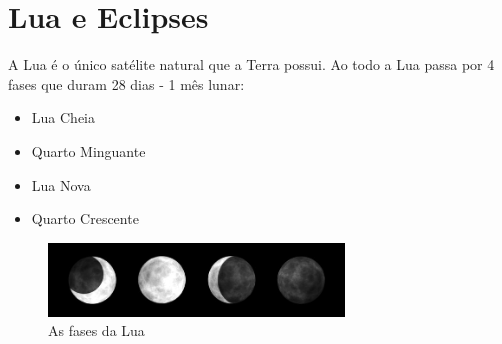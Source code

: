 \documentclass[12pt]{extarticle}
\newcommand{\<}{\langle}
\renewcommand{\>}{\rangle}
\theoremstyle{definition}
\begin{document}
\section{Lua e Eclipses}
A Lua é o único satélite natural que a Terra possui. Ao todo a Lua passa por 4 fases que duram 28 dias - 1 mês lunar:
\begin{itemize}
    \item Lua Cheia
    \item Quarto Minguante
    \item Lua Nova
    \item Quarto Crescente
\end{itemize}
\begin{figure}[H]
    \centering
    \includegraphics[width=0.7\textwidth]{fasesdaluahemisferiosul-cke.jpg}
    \caption{As fases da Lua}
    \label{fig:moon_phases}
\end{figure}
\end{document}
